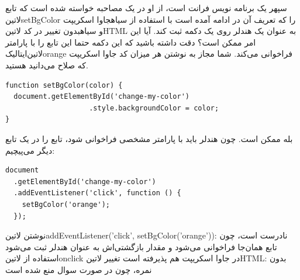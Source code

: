 
سپهر یک برنامه نویس فرانت است، از او در یک مصاحبه خواسته شده است
که تابع ‌لاتین{setBgColor}
را که تعریف آن در ادامه آمده است با استفاده از ‌سیاه{جاوا اسکریپت}
و ‌سیاه{بدون}
تغییر در کد ‌لاتین{HTML}
به عنوان یک هندلر روی یک دکمه ثبت کند. آیا این امر ممکن است؟
دقت داشته باشید که این دکمه حتما این تابع را با پارامتر ‌لاتین{‌ایتالیک{orange}}
فراخوانی می‌کند.
شما مجاز به نوشتن هر میزان کد جاوا اسکریپت که صلاح می‌دانید هستید.

\begin{latin}
\begin{verbatim}
function setBgColor(color) {
  document.getElementById('change-my-color')
                    .style.backgroundColor = color;
}
\end{verbatim}
\end{latin}


\begin{پاسخ}

بله ممکن است. چون هندلر باید با پارامتر مشخصی فراخوانی شود، تابع را در یک تابع دیگر می‌پیچیم:

\begin{latin}
\begin{verbatim}
document
  .getElementById('change-my-color')
  .addEventListener('click', function () {
    setBgColor('orange');
  });
\end{verbatim}
\end{latin}

 نوشتن ‌لاتین{addEventListener('click', setBgColor('orange'))}: نادرست است، چون تابع همان‌جا فراخوانی می‌شود و مقدار بازگشتی‌اش به عنوان هندلر ثبت می‌شود
 استفاده از ‌لاتین{onclick} در جاوا اسکریپت هم پذیرفته است
 تغییر ‌لاتین{HTML}: بدون نمره، چون در صورت سوال منع شده است

\end{پاسخ}
